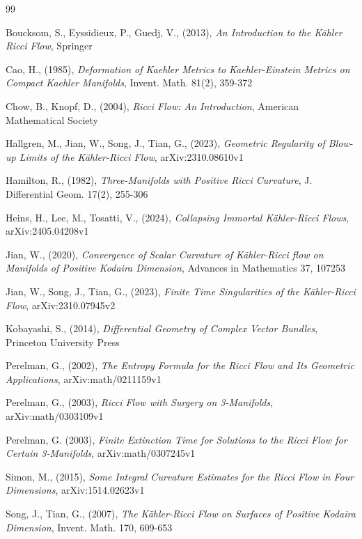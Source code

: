 \documentclass[12pt]{article}
\numberwithin{equation}{section}
\begin{document}
\begin{thebibliography}{99}

 Boucksom, S., Eyssidieux, P., Guedj, V., (2013), 
\textit{An Introduction to the K\"ahler Ricci Flow},
Springer

 Cao, H., (1985), 
\textit{Deformation of Kaehler Metrics to Kaehler-Einstein Metrics on Compact Kaehler Manifolds}, 
Invent. Math. 81(2), 359-372

 Chow, B., Knopf, D., (2004), 
\textit{Ricci Flow: An Introduction},
American Mathematical Society

 Hallgren, M., Jian, W., Song, J., Tian, G., (2023), 
\textit{Geometric Regularity of Blow-up Limits of the K\"ahler-Ricci Flow}, 
arXiv:2310.08610v1

 Hamilton, R., (1982),
\textit{Three-Manifolds with Positive Ricci Curvature},
J. Differential Geom. 17(2), 255-306

 Heins, H., Lee, M., Tosatti, V., (2024), 
\textit{Collapsing Immortal K\"ahler-Ricci Flows},
arXiv:2405.04208v1

 Jian, W., (2020), 
\textit{Convergence of Scalar Curvature of K\"ahler-Ricci flow on Manifolds of Positive Kodaira Dimension}, 
Advances in Mathematics 37, 107253

 Jian, W., Song, J., Tian, G., (2023), 
\textit{Finite Time Singularities of the K\"ahler-Ricci Flow}, arXiv:2310.07945v2

 Kobayashi, S., (2014), 
\textit{Differential Geometry of Complex Vector Bundles}, 
Princeton University Press

 Perelman, G., (2002), 
\textit{The Entropy Formula for the Ricci Flow and Its Geometric Applications}, 
arXiv:math/0211159v1

 Perelman, G., (2003),
\textit{Ricci Flow with Surgery on 3-Manifolds}, 
arXiv:math/0303109v1

 Perelman, G. (2003), 
\textit{Finite Extinction Time for Solutions to the Ricci Flow for Certain 3-Manifolds}, 
arXiv:math/0307245v1

 Simon, M., (2015),
\textit{Some Integral Curvature Estimates for the Ricci Flow in Four Dimensions},
arXiv:1514.02623v1

 Song, J., Tian, G., (2007),
\textit{The K\"ahler-Ricci Flow on Surfaces of Positive Kodaira Dimension}, 
Invent. Math. 170, 609-653


\end{thebibliography}
\end{document}
